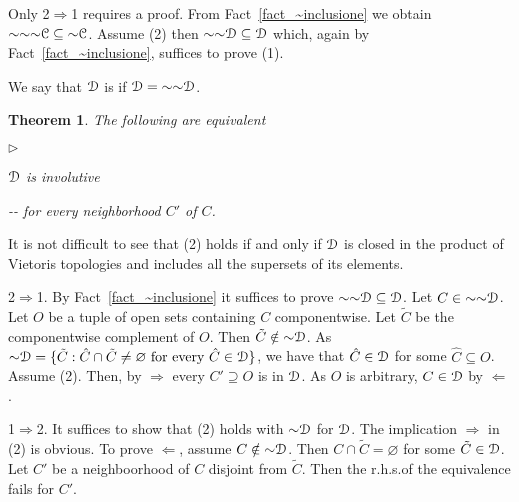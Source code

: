 \documentclass{amsproc}
\makeatletter
\newcommand{\mylabel}[1]{{#1}\hfill}
\renewenvironment{itemize}
  {\begin{list}{$\triangleright$}{%
  \setlength{\parskip}{0mm}
  \setlength{\topsep}{.1\baselineskip}
  \setlength{\rightmargin}{0mm}
  \setlength{\listparindent}{0mm}
  \setlength{\itemindent}{0mm}
  \setlength{\labelwidth}{3ex}
  \setlength{\itemsep}{.1\baselineskip}
  \setlength{\parsep}{.1\baselineskip}
  \setlength{\partopsep}{0mm}
  \setlength{\labelsep}{1ex}
  \setlength{\leftmargin}{\labelwidth+\labelsep}
  \let\makelabel\mylabel}}{%
\end{list}}
\newcounter{thm}
\theoremstyle{mio}
\newtheorem{theorem}[thm]{Theorem}\tcolorboxenvironment{theorem}{mythm}
\providecommand{\proofNameStyle}{\bfseries}
\renewenvironment{proof}[1][\proofname]{\par
  \pushQED{\qed}%
  \normalfont%
  \trivlist
  \item[\hskip\labelsep
        \proofNameStyle
    #1\@addpunct{.}]\ignorespaces
}{%
  \popQED\endtrivlist\@endpefalse
}
\renewcommand*{\emph}[1]{%
   \smash{\tikz[baseline]\node[rectangle, fill=teal!25, rounded corners, inner xsep=0.5ex, inner ysep=0.2ex, anchor=base, minimum height = 2.7ex]{\strut #1};}}
\makeatother
\begin{document}
\begin{proof}
  Only 2$\Rightarrow$1 requires a proof.
  From Fact~\ref{fact_~inclusione} we obtain ${\sim}{\sim}{\sim}{\EuScript C}\subseteq{\sim}{\EuScript C}$.
  Assume (2) then ${\sim}{\sim}{\EuScript D}\subseteq{\EuScript D}$ which, again by Fact~\ref{fact_~inclusione}, suffices to prove (1).
\end{proof}

We say that ${\EuScript D}$ is \emph{involutive\/} if ${\EuScript D}={\sim}{\sim}{\EuScript D}$.

\begin{theorem}
  The following are equivalent
  \begin{itemize}
    \item [1.] ${\EuScript D}$ is involutive 
    \item [2.] \noindent\kern-\kern-
     for every neighborhood $C'$ of $C$.
  \end{itemize}
\end{theorem}

\noindent\llap{\textcolor{red}{\Large\warning}\kern1.5ex}\ignorespaces
It is not difficult to see that (2) holds if and only if ${\EuScript D}$ is closed in the product of Vietoris topologies and includes all the supersets of its elements.

\begin{proof}
  2$\Rightarrow$1.
  By Fact~\ref{fact_~inclusione} it suffices to prove ${\sim}{\sim}{\EuScript D}\subseteq{\EuScript D}$.
  Let $C\in{\sim}{\sim}{\EuScript D}$.
  Let $O$ be a tuple of open sets containing $C$ componentwise.
  Let $\tilde C$ be the componentwise complement of $O$.  
  Then $\tilde C\notin{\sim}{\EuScript D}$.
  As ${\sim}{\EuScript D}=\{\tilde C:  \hat C\cap\tilde C\neq\varnothing\text{ for every }\hat C\in{\EuScript D}\}$, we have that $\hat C\in{\EuScript D}$ for some $\hat C\subseteq O$.
  Assume (2).
  Then, by $\Rightarrow$ every $C'\supseteq O$ is in ${\EuScript D}$.
  As $O$ is arbitrary, $C\in {\EuScript D}$ by $\Leftarrow$.

  1$\Rightarrow$2.
  It suffices to show that (2) holds with ${\sim}{\EuScript D}$ for ${\EuScript D}$.
  The implication $\Rightarrow$ in (2) is obvious.
  To prove $\Leftarrow$, assume $C\notin{\sim}{\EuScript D}$.
  Then $C\cap\tilde C=\varnothing$ for some $\tilde C\in{\EuScript D}$.
  Let $C'$ be a neighboorhood of $C$ disjoint from $\tilde C$.
  Then the r.h.s.\@ of the equivalence fails for $C'$.  
\end{proof}
\end{document}

